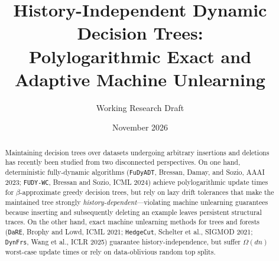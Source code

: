 \documentclass[11pt]{article}
\title{\textbf{History-Independent Dynamic Decision Trees:\\ Polylogarithmic Exact and Adaptive Machine Unlearning}}
\author{Working Research Draft}
\date{November 2026}
\theoremstyle{definition}
\begin{document}
\maketitle

\begin{abstract}
Maintaining decision trees over datasets undergoing arbitrary insertions and deletions has recently been studied from two disconnected perspectives. On one hand, deterministic fully-dynamic algorithms (\texttt{FuDyADT}, Bressan, Damay, and Sozio, AAAI 2023; \texttt{FUDY-WC}, Bressan and Sozio, ICML 2024) achieve polylogarithmic update times for $\beta$-approximate greedy decision trees, but rely on lazy drift tolerances that make the maintained tree strongly \emph{history-dependent}---violating machine unlearning guarantees because inserting and subsequently deleting an example leaves persistent structural traces. On the other hand, exact machine unlearning methods for trees and forests (\texttt{DaRE}, Brophy and Lowd, ICML 2021; \texttt{HedgeCut}, Schelter et al., SIGMOD 2021; \texttt{DynFrs}, Wang et al., ICLR 2025) guarantee history-independence, but suffer $\Omega(dn)$ worst-case update times or rely on data-oblivious random top splits.


\end{abstract}
\end{document}
